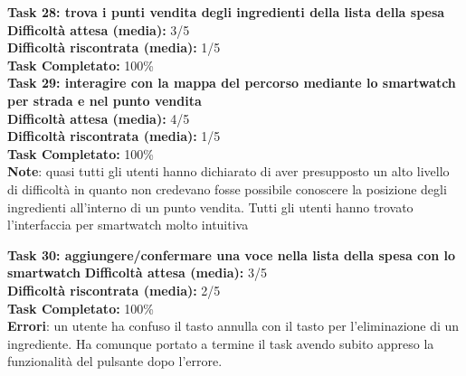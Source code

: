 \begin{itemize}
\textbf{Task 28: trova i punti vendita degli ingredienti della lista
della spesa}\\
\textbf{Difficoltà attesa (media):} 3/5\\
\textbf{Difficoltà riscontrata (media):} 1/5\\
\textbf{Task Completato:} 100\%\\

\textbf{Task 29: interagire con la mappa del percorso mediante lo
smartwatch per strada e nel punto vendita}\\
\textbf{Difficoltà attesa (media):} 4/5\\
\textbf{Difficoltà riscontrata (media):} 1/5\\
\textbf{Task Completato:} 100\%\\
\textbf{Note}: quasi tutti gli utenti hanno dichiarato di aver presupposto un alto livello
di difficoltà in quanto non credevano fosse possibile conoscere la
posizione degli ingredienti all'interno di un punto vendita. Tutti gli
utenti hanno trovato l'interfaccia per smartwatch molto intuitiva

\textbf{Task 30: aggiungere/confermare una voce nella lista della spesa con
lo smartwatch}
\textbf{Difficoltà attesa (media):} 3/5\\
\textbf{Difficoltà riscontrata (media):} 2/5\\
\textbf{Task Completato:} 100\%\\
\textbf{Errori}: un utente ha confuso il tasto annulla con il tasto per
l'eliminazione di un ingrediente. Ha comunque portato a termine il task
avendo subito appreso la funzionalità del pulsante dopo l'errore.
\end{itemize}

